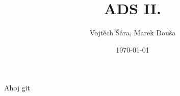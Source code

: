 \documentclass{article}
\title{ADS II.}
\date{\today}
\author{Vojtěch Šára, Marek Douša}
\begin{document}
\maketitle
Ahoj git
\end{document}
